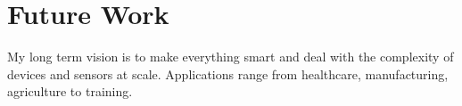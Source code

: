 \documentclass[10pt]{article}
\begin{document}

\section{Future Work}
My long term vision is to make everything smart and deal with the complexity of devices and sensors at scale.  Applications range from  healthcare, manufacturing, agriculture to training. %
\end{document}
